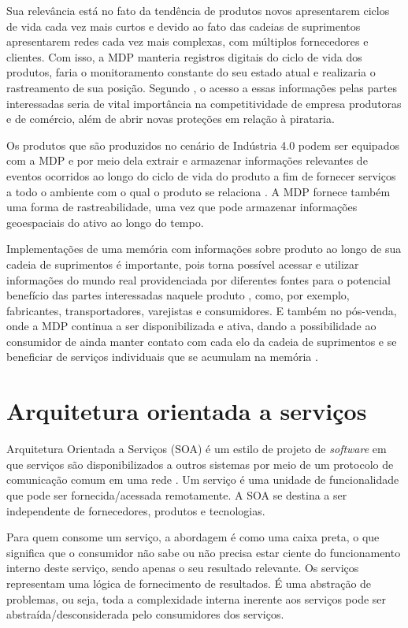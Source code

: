 	Sua relevância está no fato da tendência de produtos novos apresentarem ciclos de vida cada vez mais curtos e devido ao fato das cadeias de suprimentos apresentarem redes cada vez mais complexas, com múltiplos fornecedores e clientes. Com isso, a MDP manteria registros digitais do ciclo de vida dos produtos, faria o monitoramento constante do seu estado atual e realizaria o rastreamento de sua posição. Segundo , o acesso a essas informações pelas partes interessadas seria de vital importância na competitividade de empresa produtoras e de comércio, além de abrir novas proteções em relação à pirataria.
	
	Os produtos que são produzidos no cenário de Indústria 4.0 podem ser equipados com a MDP e por meio dela extrair e armazenar informações relevantes de eventos ocorridos ao longo do ciclo de vida do produto a fim de fornecer serviços a todo o ambiente com o qual o produto se relaciona \cite{brandherm2011productmemory}. A MDP fornece também uma forma de rastreabilidade, uma vez que pode armazenar informações geoespaciais do ativo ao longo do tempo.
	
	Implementações de uma memória com informações sobre produto ao longo de sua cadeia de suprimentos é importante, pois torna possível acessar e utilizar informações do mundo real providenciada por diferentes fontes para o potencial benefício das partes interessadas naquele produto \cite{brandherm2011productmemory}, como, por exemplo, fabricantes, transportadores, varejistas e consumidores. E também no pós-venda, onde a MDP continua a ser disponibilizada e ativa, dando a possibilidade ao consumidor de ainda manter contato com cada elo da cadeia de suprimentos e se beneficiar de serviços individuais que se acumulam na memória \cite{brandherm2011productmemory}.
	
\section{Arquitetura orientada a serviços}
	
	Arquitetura Orientada a Serviços (SOA) é um estilo de projeto de \textit{software} em que serviços são disponibilizados a outros sistemas por meio de um protocolo de comunicação comum em uma rede \cite{bell2008soa}. Um serviço é uma unidade de funcionalidade que pode ser fornecida/acessada remotamente. A SOA se destina a ser independente de fornecedores, produtos e tecnologias.
	
	Para quem consome um serviço, a abordagem é como uma caixa preta, o que significa que o consumidor não sabe ou não precisa estar ciente do funcionamento interno deste serviço, sendo apenas o seu resultado relevante. Os serviços representam uma lógica de fornecimento de resultados. É uma abstração de problemas, ou seja, toda a complexidade interna inerente aos serviços pode ser abstraída/desconsiderada pelo consumidores dos serviços.
	
